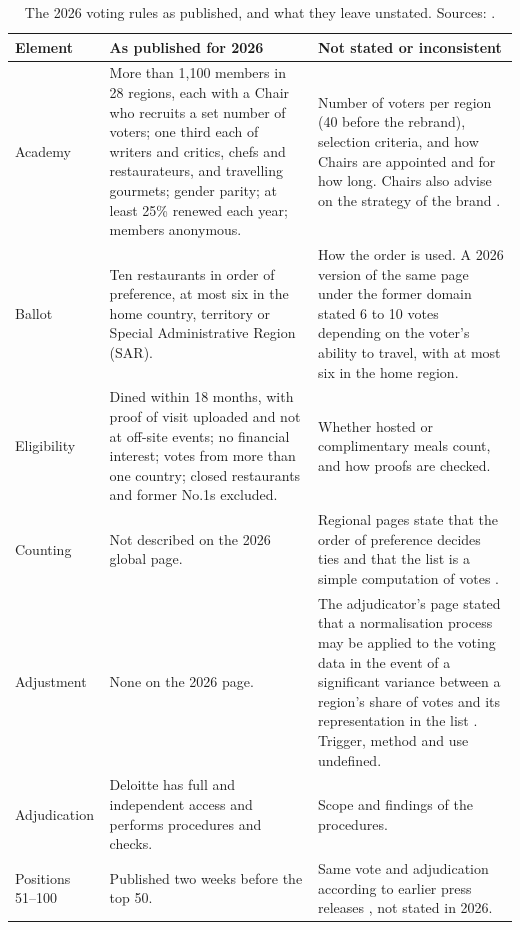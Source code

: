 \documentclass[11pt,a4paper]{article}
\begin{document}
\begin{table}[t]
\caption{The 2026 voting rules as published, and what they leave unstated. Sources: \citet{the50voting2026,the50academy2026,the50faq2026,w50bvoting2026old,w50bdeloitte,asia50voting}.}
\label{tab:rules}
\small
\begin{tabularx}{\textwidth}{@{}P{2.6cm}LL@{}}
\toprule
Element & As published for 2026 & Not stated or inconsistent \\
\midrule
Academy & More than 1,100 members in 28 regions, each with a Chair who recruits a set number of voters; one third each of writers and critics, chefs and restaurateurs, and travelling gourmets; gender parity; at least 25\% renewed each year; members anonymous. & Number of voters per region (40 before the rebrand), selection criteria, and how Chairs are appointed and for how long. Chairs also advise on the strategy of the brand \citep{w50bfaq2025}. \\
Ballot & Ten restaurants in order of preference, at most six in the home country, territory or Special Administrative Region (SAR). & How the order is used. A 2026 version of the same page under the former domain stated 6 to 10 votes depending on the voter's ability to travel, with at most six in the home region. \\
Eligibility & Dined within 18 months, with proof of visit uploaded and not at off-site events; no financial interest; votes from more than one country; closed restaurants and former No.1s excluded. & Whether hosted or complimentary meals count, and how proofs are checked. \\
Counting & Not described on the 2026 global page. & Regional pages state that the order of preference decides ties and that the list is a simple computation of votes \citep{asia50voting}. \\
Adjustment & None on the 2026 page. & The adjudicator's page stated that a normalisation process may be applied to the voting data in the event of a significant variance between a region's share of votes and its representation in the list \citep{w50bdeloitte}. Trigger, method and use undefined. \\
Adjudication & Deloitte has full and independent access and performs procedures and checks. & Scope and findings of the procedures. \\
Positions 51--100 & Published two weeks before the top 50. & Same vote and adjudication according to earlier press releases \citep{restaurantnews2024}, not stated in 2026. \\
\bottomrule
\end{tabularx}
\end{table}
\end{document}
